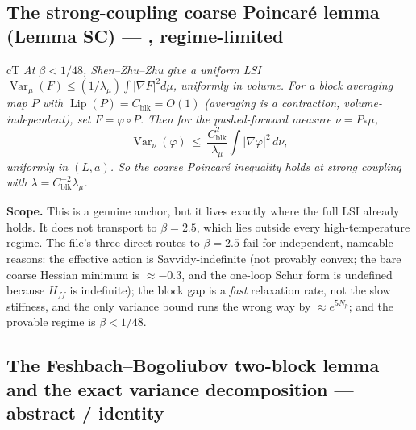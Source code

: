 \subsection{The strong-coupling coarse Poincaré lemma (Lemma SC) --- \LT, regime-limited}


\begin{claimbox}{cT}
 \emph{At $\beta<1/48$, Shen--Zhu--Zhu give a uniform LSI
$\operatorname{Var}_\mu(F)\le(1/\lambda_\mu)\int|\nabla F|^2d\mu$, uniformly in volume. For a
block averaging map $P$ with $\operatorname{Lip}(P)=C_{\mathrm{blk}}=O(1)$ (averaging is a
contraction, volume-independent), set $F=\varphi\circ P$. Then for the pushed-forward measure
$\nu=P_*\mu$,}
\begin{equation}
\operatorname{Var}_\nu(\varphi)\ \le\ \frac{C_{\mathrm{blk}}^2}{\lambda_\mu}
\int|\nabla\varphi|^2\,d\nu ,
\label{eq:sc}
\end{equation}
\emph{uniformly in $(L,a)$. So the coarse Poincaré inequality holds at strong coupling with
$\lambda=C_{\mathrm{blk}}^{-2}\lambda_\mu$.}

\smallskip
\textbf{Scope.} This is a genuine anchor, but it lives exactly where the full LSI already
holds. It does not transport to $\beta=2.5$, which lies outside every high-temperature regime.
The file's three direct routes to $\beta=2.5$ fail for independent, nameable reasons: the
effective action is Savvidy-indefinite (not provably convex; the bare coarse Hessian minimum is
$\approx-0.3$, and the one-loop Schur form is undefined because $H_{ff}$ is indefinite); the
block gap is a \emph{fast} relaxation rate, not the slow stiffness, and the only variance bound
runs the wrong way by $\approx e^{5N_p}$; and the provable regime is $\beta<1/48$.
\end{claimbox}

\subsection{The Feshbach--Bogoliubov two-block lemma and the exact variance decomposition ---
\LT{} abstract / identity}
\label{sec:feshbach}


